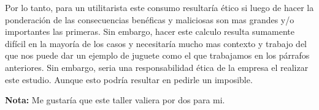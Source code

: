 \documentclass[12pt]{exam}
\begin{document}
Por lo tanto, para un utilitarista este consumo resultaría ético si luego de hacer la ponderación de las consecuencias benéficas y maliciosas son mas grandes y/o importantes las primeras. Sin embargo, hacer este calculo resulta sumamente difícil en la mayoría de los casos y necesitaría mucho mas contexto y trabajo del que nos puede dar un ejemplo de juguete como el que trabajamos en los párrafos anteriores. Sin embargo, seria una responsabilidad ética de la empresa el realizar este estudio. Aunque esto podría resultar en pedirle un imposible.

\textbf{Nota:} Me gustaría que este taller valiera por dos para mi.
\end{document}
